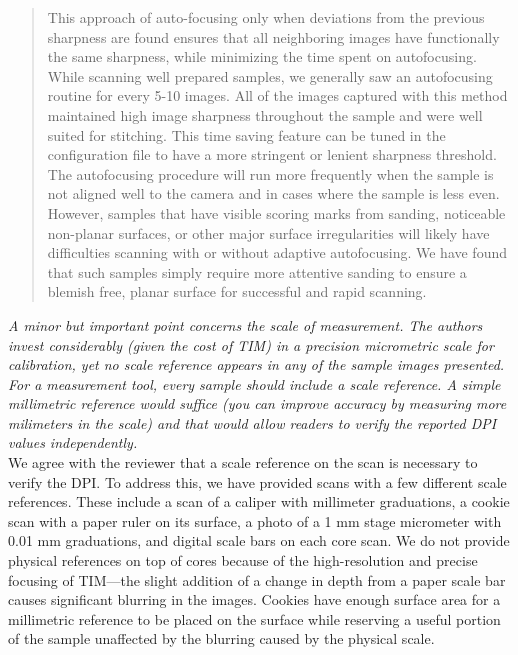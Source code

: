 \documentclass[12pt,a4paper]{article}
\begin{document}
\begin{quote}This approach of auto-focusing only when deviations from the previous sharpness are found ensures that all neighboring images have functionally the same sharpness, while minimizing the time spent on autofocusing. 
While scanning well prepared samples, we generally saw an autofocusing routine for every 5-10 images. All of the images captured with this method maintained high image sharpness throughout the sample and were well suited for stitching. 
This time saving feature can be tuned in the configuration file to have a more stringent or lenient sharpness threshold. 
The autofocusing procedure will run more frequently when the sample is not aligned well to the camera and in cases where the sample is less even. However, samples that have visible scoring marks from sanding, noticeable non-planar surfaces, or other major surface irregularities will likely have difficulties scanning with or without adaptive autofocusing. We have found that such samples simply require more attentive sanding to ensure a blemish free, planar surface for successful and rapid scanning. \end{quote}

\emph{A minor but important point concerns the scale of measurement. The authors invest considerably (given the cost of TIM) in a precision micrometric scale for calibration, yet no scale reference appears in any of the sample images presented. For a measurement tool, every sample should include a scale reference. A simple millimetric reference would suffice (you can improve accuracy by measuring more milimeters in the scale) and that would allow readers to verify the reported DPI values independently.}\\

We agree with the reviewer that a scale reference on the scan is necessary to verify the DPI. To address this, we have provided scans with a few different scale references. These include a scan of a caliper with millimeter graduations, a cookie scan with a paper ruler on its surface, a photo of a 1 mm stage micrometer with 0.01 mm graduations, and digital scale bars on each core scan. We do not provide physical references on top of cores because of the high-resolution and precise focusing of TIM---the slight addition of a change in depth from a paper scale bar causes significant blurring in the images. Cookies have enough surface area for a millimetric reference to be placed on the surface while reserving a useful portion of the sample unaffected by the blurring caused by the physical scale. \\%
\end{document}
